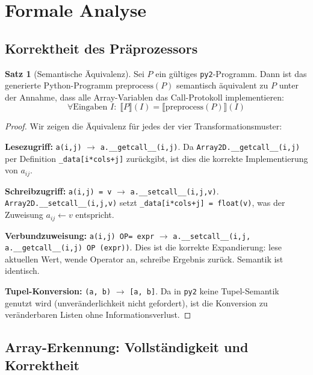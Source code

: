 ﻿\documentclass[a4paper,12pt]{article}
\theoremstyle{definition}
\newtheorem{satz}{Satz}
\begin{document}
\section{Formale Analyse}

\subsection{Korrektheit des Pr\"aprozessors}

\begin{satz}[Semantische \"Aquivalenz]
	Sei $P$ ein g\"ultiges \texttt{py2}-Programm. Dann ist das generierte Python-Programm
	$\text{preprocess}(P)$ semantisch \"aquivalent zu $P$ unter der Annahme, dass alle
	Array-Variablen das Call-Protokoll implementieren:
	\[
		\forall \text{Eingaben } I: \;\llbracket P \rrbracket(I) = \llbracket \text{preprocess}(P) \rrbracket(I)
	\]
\end{satz}

\begin{proof}
	Wir zeigen die \"Aquivalenz f\"ur jedes der vier Transformationsmuster:

	\textbf{Lesezugriff:} \texttt{a(i,j)} $\to$ \texttt{a.\_\_getcall\_\_(i,j)}.
	Da \texttt{Array2D.\_\_getcall\_\_(i,j)} per Definition \texttt{\_data[i*cols+j]}
	zur\"uckgibt, ist dies die korrekte Implementierung von $a_{ij}$.

	\textbf{Schreibzugriff:} \texttt{a(i,j) = v} $\to$ \texttt{a.\_\_setcall\_\_(i,j,v)}.
	\texttt{Array2D.\_\_setcall\_\_(i,j,v)} setzt \texttt{\_data[i*cols+j] = float(v)},
	was der Zuweisung $a_{ij} \leftarrow v$ entspricht.

	\textbf{Verbundzuweisung:} \texttt{a(i,j) OP= expr} $\to$
	\texttt{a.\_\_setcall\_\_(i,j, a.\_\_getcall\_\_(i,j) OP (expr))}.
	Dies ist die korrekte Expandierung: lese aktuellen Wert, wende Operator an,
	schreibe Ergebnis zur\"uck. Semantik ist identisch.

	\textbf{Tupel-Konversion:} \texttt{(a, b)} $\to$ \texttt{[a, b]}.
	Da in \texttt{py2} keine Tupel-Semantik genutzt wird (unveränderlichkeit nicht
	gefordert), ist die Konversion zu ver\"anderbaren Listen ohne Informationsverlust.
\end{proof}

\subsection{Array-Erkennung: Vollst\"andigkeit und Korrektheit}
\end{document}
